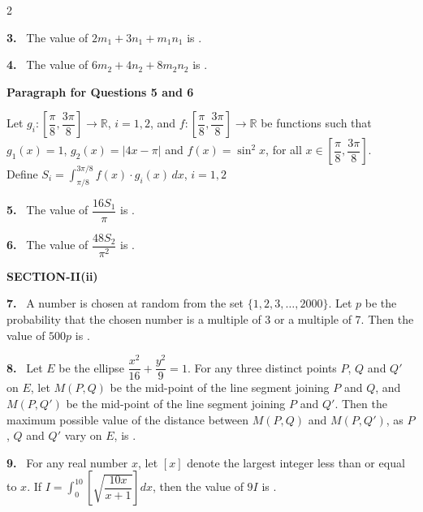 \documentclass[10pt]{extarticle}
\newcommand{\sect}[1]{\par\smallskip\noindent\textbf{#1}\par}
\newcommand{\qn}[1]{\par\smallskip\noindent\textbf{#1.}~}
\newcommand{\paraq}[2]{\par\smallskip\noindent\textbf{Paragraph for Questions #1 and #2}\par}
\begin{document}
\begin{multicols}{2}
\qn{3} The value of $2m_1+3n_1+m_1n_1$ is \underline{\hspace{2.5em}}.

\qn{4} The value of $6m_2+4n_2+8m_2n_2$ is \underline{\hspace{2.5em}}.

\paraq{5}{6}
Let $g_i:\left[\dfrac\pi8,\dfrac{3\pi}8\right]\to\mathbb R$, $i=1,2$, and $f:\left[\dfrac\pi8,\dfrac{3\pi}8\right]\to\mathbb R$ be functions such that $g_1(x)=1$, $g_2(x)=|4x-\pi|$ and $f(x)=\sin^2x$, for all $x\in\left[\dfrac\pi8,\dfrac{3\pi}8\right]$.\\
Define $S_i=\displaystyle\int_{\pi/8}^{3\pi/8}f(x)\cdot g_i(x)\,dx$, $i=1,2$

\qn{5} The value of $\dfrac{16S_1}{\pi}$ is \underline{\hspace{2.5em}}.

\qn{6} The value of $\dfrac{48S_2}{\pi^2}$ is \underline{\hspace{2.5em}}.

\sect{SECTION-II(ii)}
\qn{7} A number is chosen at random from the set $\{1,2,3,\dots,2000\}$. Let $p$ be the probability that the chosen number is a multiple of 3 or a multiple of 7. Then the value of $500p$ is \underline{\hspace{2.5em}}.

\qn{8} Let $E$ be the ellipse $\dfrac{x^2}{16}+\dfrac{y^2}{9}=1$. For any three distinct points $P$, $Q$ and $Q'$ on $E$, let $M(P,Q)$ be the mid-point of the line segment joining $P$ and $Q$, and $M(P,Q')$ be the mid-point of the line segment joining $P$ and $Q'$. Then the maximum possible value of the distance between $M(P,Q)$ and $M(P,Q')$, as $P$, $Q$ and $Q'$ vary on $E$, is \underline{\hspace{2.5em}}.

\qn{9} For any real number $x$, let $[x]$ denote the largest integer less than or equal to $x$. If $I=\displaystyle\int_0^{10}\left[\sqrt{\dfrac{10x}{x+1}}\right]dx$, then the value of $9I$ is \underline{\hspace{2.5em}}.

\end{multicols}
\end{document}
